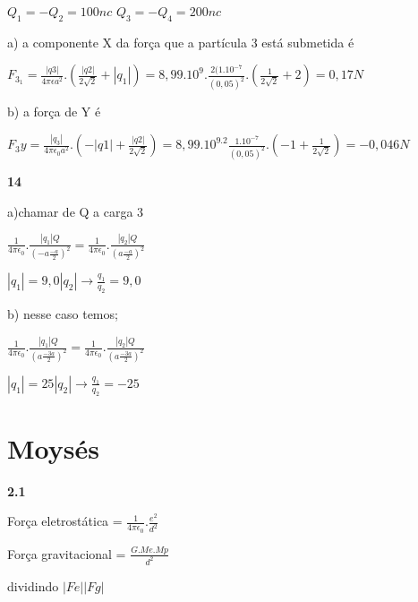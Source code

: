 \documentclass{article}
\begin{document}
$Q_1 = -Q_2 = 100 nc$\newline
$Q_3 = -Q_4 = 200 nc$\newline

a)\newline
a componente X da força que a partícula 3 está submetida é\newline

$F_3_1 = \frac{|q3|}{4\pi\epsilon a^2}. (\frac{|q2|}{2\sqrt{2}} + |q_1|) = 8,99.10^9. \frac{2(1.10^{-7}}{(0,05)^2}. (\frac{1}{2\sqrt{2}} + 2) = 0,17 N$\newline

b)\newline
a força de Y é\newline

$F_3y = \frac{|q_3|}{4\pi\epsilon_0 a^2}. (-|q1| + \frac{|q2|}{2\sqrt{2}}) = 8,99.10^9.2\frac{1.10^{-7}}{(0,05)^2}.(-1 + \frac{1}{2\sqrt{2}}) = -0,046N$

\textbf{14}\newline

a)chamar de Q a carga 3\newline

$\frac{1}{4\pi \epsilon_0}.\frac{|q_1|Q}{(-a\frac{-a}{2})^2}=
\frac{1}{4\pi \epsilon_0}.\frac{|q_2|Q}{(a\frac{-a}{2})^2}$\newline

$|q_1|=9,0|q_2| \rightarrow \frac{q_1}{q_2}=9,0$\newline

b) nesse caso temos;\newline

$\frac{1}{4\pi \epsilon_0}.\frac{|q_1|Q}{(a\frac{-3a}{2})^2}=
\frac{1}{4\pi \epsilon_0}.\frac{|q_2|Q}{(a\frac{-3a}{2})^2}$

$|q_1|=25|q_2| \rightarrow \frac{q_1}{q_2}=-25$\newline



\section{Moysés}

\textbf{2.1}\newline

Força eletrostática = $\frac{1}{4\pi\epsilon_0}.\frac{e^2}{d^2}$\newline

Força gravitacional = $\frac{G . Me . Mp}{d^2}$\newline

dividindo $|Fe||Fg|$\newline
\end{document}
